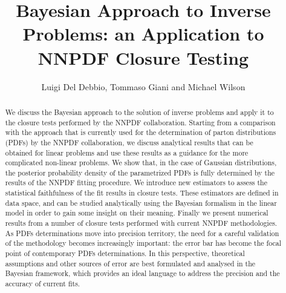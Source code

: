 \documentclass[11pt]{article}
\title{Bayesian Approach to Inverse Problems: an Application to NNPDF Closure Testing}
\author{Luigi Del Debbio, Tommaso Giani and Michael Wilson}
\begin{document}
\maketitle

\begin{abstract}
    We discuss the Bayesian approach to the solution of inverse problems and apply it to the
    closure tests performed by the NNPDF collaboration. Starting from a comparison with
    the approach that is currently used for the determination of parton distributions 
    (PDFs) by the NNPDF collaboration, we discuss analytical results that can be obtained for 
    linear problems and use these results as a guidance for the more complicated non-linear problems. 
    We show that, in the case of Gaussian distributions, the posterior probability density
    of the parametrized PDFs is fully determined by the results of the NNPDF fitting procedure. 
    We introduce new estimators to assess the statistical faithfulness of the fit results in 
    closure tests. These estimators are defined in data space, and can be studied analytically 
    using the Bayesian formalism in the linear model in order to gain some insight on their
    meaning. Finally we present numerical results from a number of closure tests performed 
    with current NNPDF methodologies. As PDFs determinations move into precision territory, 
    the need for a careful validation of the methodology becomes increasingly important: the error
    bar has become the focal point of contemporary PDFs determinations. In this perspective,
    theoretical assumptions and other sources of error are best formulated and analysed
    in the Bayesian framework, which provides an ideal language to address the 
    precision and the accuracy of current fits. 

\end{abstract}





%
%


\appendix





\end{document}
